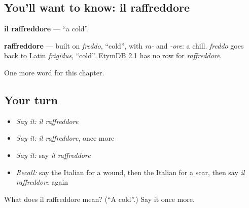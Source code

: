 \subsection*{You'll want to know: il raffreddore}
\textbf{il raffreddore} — \textquotedblleft{}a cold\textquotedblright{}.

\begin{cousinweb}
\textbf{raffreddore} — built on \emph{freddo}, \textquotedblleft{}cold\textquotedblright{}, with \emph{ra-} and \emph{-ore}: a chill. \emph{freddo} goes back to Latin \emph{frigidus}, \textquotedblleft{}cold\textquotedblright{}. EtymDB 2.1 has no row for \emph{raffreddore}.
\end{cousinweb}

\begin{grammarlens}[title={What you've built}]
One more word for this chapter.
\end{grammarlens}

\subsection*{Your turn}
\begin{itemize}
\raggedright
  \item \emph{Say it:} \emph{il raffreddore}
  \item \emph{Say it:} \emph{il raffreddore}, once more
  \item \emph{Say it:} say \emph{il raffreddore}
  \item \emph{Recall:} say the Italian for a wound, then the Italian for a scar, then say \emph{il raffreddore} again
\end{itemize}

\begin{tcolorbox}[breakable,colback=teal!4,colframe=teal!35!black,title={Before you move on}]
What does il raffreddore mean? (\textquotedblleft{}A cold\textquotedblright{}.) Say it once more.
\end{tcolorbox}
